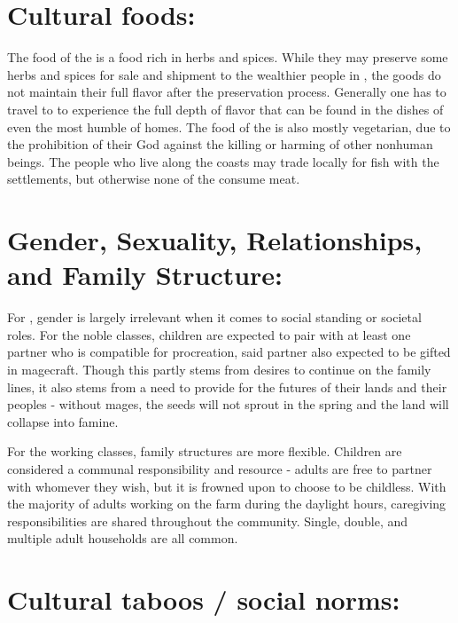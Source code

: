 \documentclass[blue]{GL2020}
\begin{document}
\section*{Cultural foods:}

The food of the \pFarm{} is a food rich in herbs and spices.  While they may preserve some herbs and spices for sale and shipment to the wealthier people in \pTech{}, the goods do not maintain their full flavor after the preservation process.  Generally one has to travel to \pFarm{} to experience the full depth of flavor that can be found in the dishes of even the most humble of homes.  The food of the \pFarmers{} is also mostly vegetarian, due to the prohibition of their God against the killing or harming of other nonhuman beings.  The people who live along the coasts may trade locally for fish with the \pShip{} settlements, but otherwise none of the \pFarm{} consume meat.

\section*{Gender, Sexuality, Relationships, and Family Structure:}

For \pFarm{}, gender is largely irrelevant when it comes to social standing or societal roles.  For the noble classes, children are expected to pair with at least one partner who is compatible for procreation, said partner also expected to be gifted in magecraft.  Though this partly stems from desires to continue on the family lines, it also stems from a need to provide for the futures of their lands and their peoples - without mages, the seeds will not sprout in the spring and the land will collapse into famine.   %

For the working classes, family structures are more flexible.  Children are considered a communal responsibility and resource - adults are free to partner with whomever they wish, but it is frowned upon to choose to be childless.  With the majority of adults working on the farm during the daylight hours, caregiving responsibilities are shared throughout the community.  Single, double, and multiple adult households are all common.       

\section*{Cultural taboos / social norms:}
\end{document}
